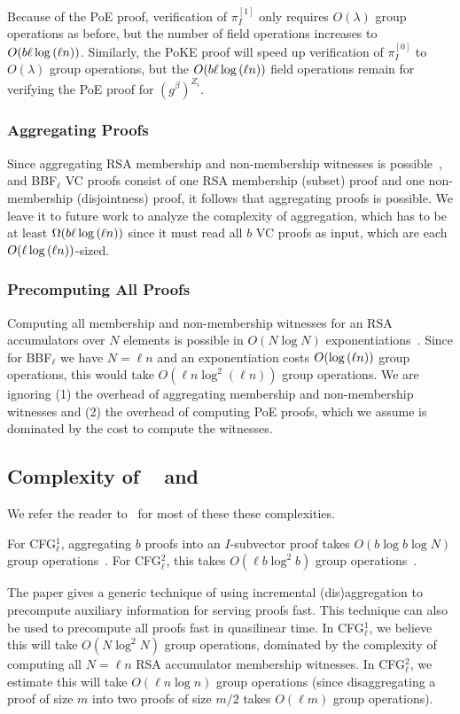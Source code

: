 Because of the PoE proof, verification of $\pi_I^{[1]}$ only requires $O(\lambda)$ group operations as before, but the number of field operations increases to $O(b\ell\log{(\ell n)})$.
Similarly, the PoKE proof will speed up verification of $\pi_I^{[0]}$ to $O(\lambda)$ group operations, but the $O(b\ell\log{(\ell n)})$ field operations remain for verifying the PoE proof for $\left(g^{\beta}\right)^{Z_i}$.

\subsubsection{Aggregating Proofs}
Since aggregating RSA membership and non-membership witnesses is possible~\cite{BBF18}, and BBF$_\ell$ VC proofs consist of one RSA membership (subset) proof and one non-membership (disjointness) proof, it follows that aggregating proofs is possible.
We leave it to future work to analyze the complexity of aggregation, which has to be at least $\Omega(b\ell\log{(\ell n)})$ since it must read all $b$ VC proofs as input, which are each $O(\ell\log{(\ell n)})$-sized.

\subsubsection{Precomputing All Proofs}
Computing all membership and non-membership witnesses for an RSA accumulators over $N$ elements is possible in $O(N\log{N})$ exponentiations~\cite{BBF18,SSY01}.
Since for BBF$_\ell$ we have $N=\ell n$ and an exponentiation costs $O(\log{(\ell n)})$ group operations, this would take $O(\ell n \log^2{(\ell n)})$ group operations.
We are ignoring (1) the overhead of aggregating membership and non-membership witnesses and (2) the overhead of computing PoE proofs, which we assume is dominated by the cost to compute the witnesses.

\subsection{Complexity of \cfgOne~\cite{CFG+20} and \cfgTwo~\cite{CF13,LM19,CFG+20}}

We refer the reader to~\cite[Table 1, pg. 35]{CFG+20} for most of these these complexities.

For CFG$_{\ell}^1$, aggregating $b$ proofs into an $I$-subvector proof takes $O(b\log{b}\log{N})$ group operations~\cite[Sec 5.1, pg. 23]{CFG+20}.
For CFG$_{\ell}^2$, this takes $O(\ell b\log^2{b})$ group operations~\cite[Sec 5.2, pg. 32]{CFG+20}.

The paper gives a generic technique of using incremental (dis)aggregation to precompute auxiliary information for serving proofs fast.
This technique can also be used to precompute all proofs fast in quasilinear time.
In CFG$_\ell^{1}$, we believe this will take $O(N\log^2{N})$ group operations, dominated by the complexity of computing all $N=\ell n$ RSA accumulator membership witnesses.
In CFG$_\ell^{2}$, we estimate this will take $O(\ell n\log{n})$ group operations (since disaggregating a proof of size $m$ into two proofs of size $m/2$ takes $O(\ell m)$ group operations).
